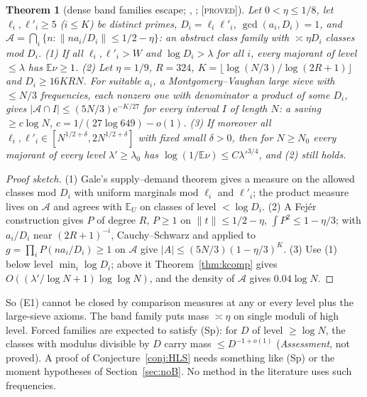 \documentclass[10pt,reqno]{amsart}
\newtheorem{theorem}{Theorem}[section]
\theoremstyle{definition}
\theoremstyle{remark}
\newcommand{\A}{\mathcal A}
\newcommand{\E}{\mathbb E}
\newcommand{\e}{\mathrm e}
\newcommand{\lab}[1]{\textup{[\textsc{#1}]}}
\begin{document}
\begin{theorem}[dense band families escape; {\cite[Lemma~8.1, Props~8.2, 8.4, 8.6, Thm~8.5]{LS2}}, {\cite{LS2revb}}; \lab{proved}]\label{thm:band}
Let $0<\eta\leq1/8$, let $\ell_i,\ell'_i\geq5$ ($i\leq K$) be distinct primes,
$D_i=\ell_i\ell'_i$, $\gcd(a_i,D_i)=1$, and $\A=\bigcap_i\{n:\|na_i/D_i\|\leq1/2-\eta\}$: an
abstract class family with $\asymp\eta D_i$ classes mod $D_i$.
(1) If all $\ell_i,\ell'_i>W$ and $\log D_i>\lambda$ for all $i$, every majorant of
level $\leq\lambda$ has $\E\nu\geq1$.
(2) Let $\eta=1/9$, $R=324$, $K=\lfloor\log(N/3)/\log(2R+1)\rfloor$ and $D_i\geq16KRN$.
For suitable $a_i$, a Montgomery--Vaughan large sieve with $\leq N/3$
frequencies, each nonzero one with denominator a product of some $D_i$,
gives $|\A\cap I|\leq(5N/3)\e^{-K/27}$ for every interval $I$ of length $N$: a
saving $\geq c\log N$, $c=1/(27\log649)-o(1)$.
(3) If moreover all $\ell_i,\ell'_i\in[N^{1/2+\delta},2N^{1/2+\delta}]$ with fixed small
$\delta>0$, then for $N\geq N_0$ every majorant of every level $\lambda'\geq\lambda_0$ has
$\log(1/\E\nu)\leq C\lambda'^{3/4}$, and (2) still holds.
\end{theorem}
\begin{proof}[Proof sketch]
(1) Gale's supply--demand theorem gives a measure on the allowed classes
mod $D_i$ with uniform marginals mod $\ell_i$ and $\ell'_i$; the product measure
lives on $\A$ and agrees with $\E_U$ on classes of level $<\log D_i$.  (2) A
Fej\'er construction gives $P$ of degree $R$, $P\geq1$ on $\|t\|\leq1/2-\eta$,
$\int P^2\leq1-\eta/3$; with $a_i/D_i$ near $(2R+1)^{-i}$, Cauchy--Schwarz and \cite{MV}
applied to $g=\prod_iP(na_i/D_i)\geq1$ on $\A$ give $|A|\leq(5N/3)(1-\eta/3)^K$.  (3) Use
(1) below level $\min_i\log D_i$; above it Theorem~\ref{thm:kcomp} gives
$O((\lambda'/\log N+1)\log\log N)$, and the density of $\A$ gives $0.04\log N$.
\end{proof}
So (E1) cannot be closed by comparison measures at any or every level plus
the large-sieve axioms.  The band family puts mass $\asymp\eta$ on single
moduli of high level.  Forced families are expected to satisfy (Sp): for
$D$ of level $\geq\log N$, the classes with modulus divisible by $D$ carry
mass $\leq D^{-1+o(1)}$ (\emph{Assessment}, not proved).  A proof of
Conjecture~\ref{conj:HLS} needs something like (Sp) or the moment
hypotheses of Section~\ref{sec:noB}.  No method in the literature uses such frequencies.
\end{document}
